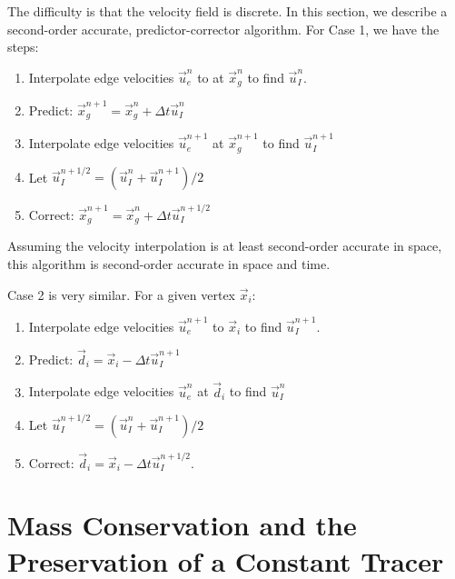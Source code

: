 \documentclass[11pt]{report}
\newcommand{\svec}[1]{{\Vec{#1}}}
\begin{document}
The difficulty is that the velocity field is discrete.  In this section, we
describe a second-order accurate, predictor-corrector algorithm.
For Case 1, we have the steps:
\begin{enumerate}
\item Interpolate edge velocities $\svec{u}^n_e$ to at $\svec{x}_g^n$ to find
  $\svec{u}_I^n$.
\item Predict: $\svec{x}_g^{n+1} = \svec{x}_g^{n} + \Delta
  t\svec{u}_I^n$
\item Interpolate edge velocities $\svec{u}^{n+1}_e$ at $\svec{x}_g^{n+1}$
   to find $\svec{u}_I^{n+1}$
\item Let $\svec{u}_I^{n+1/2} = (\svec{u}_I^{n} + \svec{u}_I^{n+1})/2$
\item Correct: $\svec{x}_g^{n+1} = \svec{x}_g^{n} + \Delta
  t\svec{u}_I^{n+1/2}$
\end{enumerate}
Assuming the velocity interpolation is at least second-order accurate in
space, this algorithm is second-order accurate in space and time.

Case 2 is very similar.  For a given vertex $\svec{x}_i$:
\begin{enumerate}
\item Interpolate edge velocities $\svec{u}^{n+1}_e$ to
  $\svec{x}_i$ to find $\svec{u}_I^{n+1}$.
\item Predict: $\svec{d}_i = \svec{x}_i - \Delta
  t\svec{u}_I^{n+1}$
\item Interpolate edge velocities $\svec{u}^{n}_e$ at $\svec{d}_i$
   to find $\svec{u}_I^{n}$
\item Let $\svec{u}_I^{n+1/2} = (\svec{u}_I^{n} + \svec{u}_I^{n+1})/2$
\item Correct: $\svec{d}_i = \svec{x}_i - \Delta
  t\svec{u}_I^{n+1/2}$.
\end{enumerate}

\section{Mass Conservation and the Preservation of a Constant Tracer}
\end{document}
